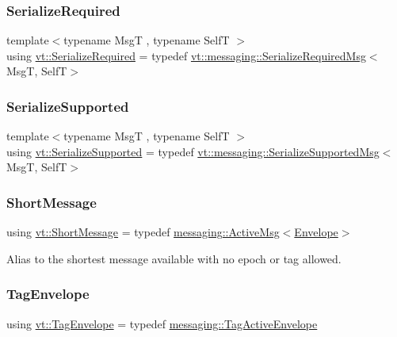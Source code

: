 \subsubsection{\texorpdfstring{Serialize\+Required}{SerializeRequired}}
{\footnotesize\ttfamily template$<$typename MsgT , typename SelfT $>$ \\
using \hyperlink{namespacevt_a9e60e2e8929828639383ac1d6643384d}{vt\+::\+Serialize\+Required} = typedef \hyperlink{structvt_1_1messaging_1_1_serialize_required_msg}{vt\+::messaging\+::\+Serialize\+Required\+Msg}$<$MsgT, SelfT$>$}

\mbox{\label{namespacevt_a3862b8e3f67ab03f3a4313d828592fa9}} 
\subsubsection{\texorpdfstring{Serialize\+Supported}{SerializeSupported}}
{\footnotesize\ttfamily template$<$typename MsgT , typename SelfT $>$ \\
using \hyperlink{namespacevt_a3862b8e3f67ab03f3a4313d828592fa9}{vt\+::\+Serialize\+Supported} = typedef \hyperlink{structvt_1_1messaging_1_1_serialize_supported_msg}{vt\+::messaging\+::\+Serialize\+Supported\+Msg}$<$MsgT, SelfT$>$}

\mbox{\label{namespacevt_a1125ac1da6c0bbf141e0ea0739d7602d}} 
\subsubsection{\texorpdfstring{Short\+Message}{ShortMessage}}
{\footnotesize\ttfamily using \hyperlink{namespacevt_a1125ac1da6c0bbf141e0ea0739d7602d}{vt\+::\+Short\+Message} = typedef \hyperlink{structvt_1_1messaging_1_1_active_msg}{messaging\+::\+Active\+Msg}$<$\hyperlink{namespacevt_aa9c8cc094b5361482021d63012987814}{Envelope}$>$}



Alias to the shortest message available with no epoch or tag allowed. 

\mbox{\label{namespacevt_a7b951ab92dca9319e12e3fc406ccb309}} 
\subsubsection{\texorpdfstring{Tag\+Envelope}{TagEnvelope}}
{\footnotesize\ttfamily using \hyperlink{namespacevt_a7b951ab92dca9319e12e3fc406ccb309}{vt\+::\+Tag\+Envelope} = typedef \hyperlink{structvt_1_1messaging_1_1_tag_active_envelope}{messaging\+::\+Tag\+Active\+Envelope}}

